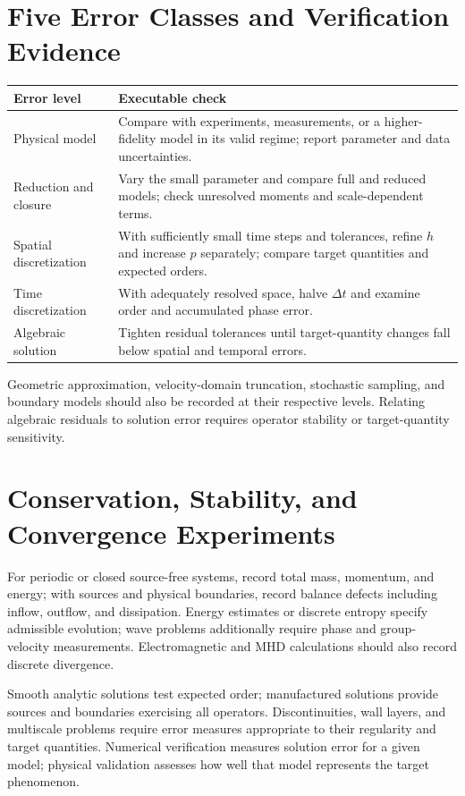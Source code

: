 \section{Five Error Classes and Verification Evidence}
\begin{center}\small
\begin{tabularx}{\textwidth}{@{}l>{\raggedright\arraybackslash}X@{}}
\toprule
Error level & Executable check\\
\midrule
Physical model & Compare with experiments, measurements, or a higher-fidelity model in its valid regime; report parameter and data uncertainties.\\
Reduction and closure & Vary the small parameter and compare full and reduced models; check unresolved moments and scale-dependent terms.\\
Spatial discretization & With sufficiently small time steps and tolerances, refine $h$ and increase $p$ separately; compare target quantities and expected orders.\\
Time discretization & With adequately resolved space, halve $\Delta t$ and examine order and accumulated phase error.\\
Algebraic solution & Tighten residual tolerances until target-quantity changes fall below spatial and temporal errors.\\
\bottomrule
\end{tabularx}
\end{center}
Geometric approximation, velocity-domain truncation, stochastic sampling, and boundary models should also be recorded at their respective levels.
Relating algebraic residuals to solution error requires operator stability or target-quantity sensitivity.

\section{Conservation, Stability, and Convergence Experiments}
For periodic or closed source-free systems, record total mass, momentum, and energy;
with sources and physical boundaries, record balance defects including inflow, outflow, and dissipation.
Energy estimates or discrete entropy specify admissible evolution; wave problems additionally require phase and group-velocity measurements.
Electromagnetic and MHD calculations should also record discrete divergence.

Smooth analytic solutions test expected order; manufactured solutions provide sources and boundaries exercising all operators.
Discontinuities, wall layers, and multiscale problems require error measures appropriate to their regularity and target quantities.
Numerical verification measures solution error for a given model; physical validation assesses how well that model represents the target phenomenon.

